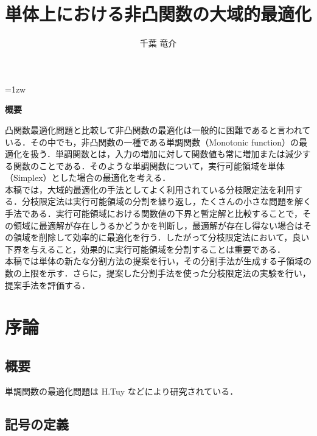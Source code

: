 \documentclass[a4paper,11pt]{jreport}
\title{単体上における非凸関数の大域的最適化}
\author{千葉 竜介}
\begin{document}
\maketitle
\thispagestyle{empty}
\newpage

\thispagestyle{empty}
\vspace*{20pt plus 1fil}
\parindent=1zw
\noindent
\begin{center}
{\bf 概要}
\vspace{5mm}
\end{center}

凸関数最適化問題と比較して非凸関数の最適化は一般的に困難であると言われている．その中でも，非凸関数の一種である単調関数（Monotonic function）の最適化を扱う．単調関数とは，入力の増加に対して関数値も常に増加または減少する関数のことである．そのような単調関数について，実行可能領域を単体（Simplex）とした場合の最適化を考える．\\
本稿では，大域的最適化の手法としてよく利用されている分枝限定法を利用する．分枝限定法は実行可能領域の分割を繰り返し，たくさんの小さな問題を解く手法である．実行可能領域における関数値の下界と暫定解と比較することで，その領域に最適解が存在しうるかどうかを判断し，最適解が存在し得ない場合はその領域を削除して効率的に最適化を行う．したがって分枝限定法において，良い下界を与えること，効果的に実行可能領域を分割することは重要である．\\
本稿では単体の新たな分割方法の提案を行い，その分割手法が生成する子領域の数の上限を示す．さらに，提案した分割手法を使った分枝限定法の実験を行い，提案手法を評価する．\\

\par
\vspace{0pt plus 1fil}
\newpage

\tableofcontents
\listoffigures
\listoftables

\pagebreak
\setcounter{page}{1}


\chapter{序論}
\section{概要}

単調関数の最適化問題は H.Tuy \cite{tuy} などにより研究されている．

\section{記号の定義}
\end{document}
